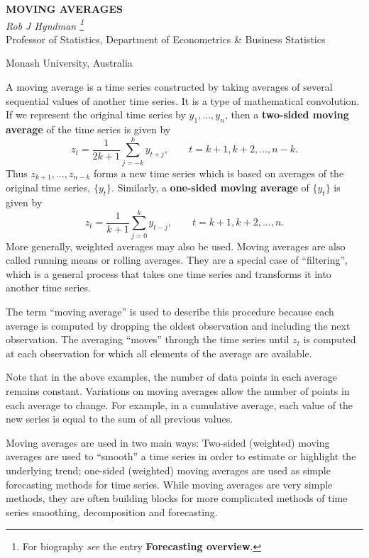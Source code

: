 \documentclass[10pt]{article}
\begin{document}
\begin{center}
{\large \bf MOVING AVERAGES}\\[2mm]

{\large \it Rob J Hyndman \footnote{For biography \textit{see} the entry \textbf{Forecasting overview}.}}\\[2mm]

Professor of Statistics, Department of Econometrics \& Business Statistics

Monash University, Australia\\

\end{center}


A moving average is a time series constructed by taking averages of several sequential values of another time series. It is a type of mathematical convolution. If we represent the original time series by $y_1,\dots,y_n$, then a \textbf{two-sided moving average} of the time series is given by
\[
z_t = \frac{1}{2k+1}\sum_{j=-k}^{k} y_{t+j}, \qquad t=k+1,k+2,\dots,n-k.
\]
Thus $z_{k+1},\dots,z_{n-k}$ forms a new time series which is based on averages of the original time series, $\{y_t\}$. Similarly, a \textbf{one-sided moving average} of $\{y_t\}$ is given by
\[
z_t = \frac1{k+1}\sum_{j=0}^{k} y_{t-j}, \qquad t=k+1,k+2,\dots,n.
\]
More generally, weighted averages may also be used. Moving averages are also called running means or rolling averages. They are a special case of ``filtering'', which is a general process that takes one time series and transforms it into another time series.

The term ``moving average'' is used to describe this procedure because each average is computed by dropping the oldest observation and including the next observation.  The averaging ``moves'' through the time series until $z_t$ is computed at each observation for which all elements of the average are available.

Note that in the above examples, the number of data points in each average remains constant. Variations on moving averages allow the number of points in each average to change. For example, in a cumulative average, each value of the new series is equal to the sum of all previous values.

Moving averages are used in two main ways: Two-sided (weighted) moving averages are used to ``smooth'' a time series in order to estimate or highlight the underlying trend; one-sided (weighted) moving averages are used as simple forecasting methods for time series. While moving averages are very simple methods, they are often building blocks for more complicated methods of time series smoothing,  decomposition and forecasting.
\end{document}
